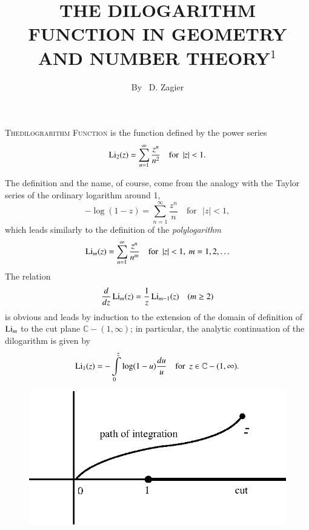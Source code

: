 \title{THE DILOGARITHM FUNCTION IN GEOMETRY AND NUMBER THEORY$^{1}$}


\author{By~ D. Zagier}

\date{}
\maketitle

\setcounter{pageoriginal}{230}
\textsc{The\pageoriginale dilograrithm Function} is the function defined by the power series
$$
\operatorname{Li}_{2}(z)=\sum\limits_{n=1}^{\infty} \frac{z^{n}}{n^{2}}\quad\text{for~ } |z|<1.
$$

The definition and the name, of course, come from the analogy with the Taylor series of the ordinary logarithm around 1,
$$
-\log (1-z)=\sum\limits^{\infty}_{n=1}\frac{z^{n}}{n}\quad\text{for~ } |z|<1,
$$
which leads similarly to the definition of the {\em polylogarithm}
$$
\operatorname{Li}_{m}(z)=\sum\limits^{\infty}_{n=1}\frac{z^{n}}{n^{m}}\quad\text{for~ } |z|<1, \ m=1,2,\ldots
$$
The relation
$$
\frac{d}{dz}\operatorname{Li}_{m}(z)=\frac{1}{z}\operatorname{Li}_{m-1}(z)\quad (m\geq 2)
$$
is obvious and leads by induction to the extension of the domain of definition of $\operatorname{Li}_{m}$ to the cut plane $\mathbb{C}-(1,\infty)$; in particular, the analytic continuation of the dilogarithm is given by
$$
\operatorname{Li}_{1}(z)=-\int\limits^{z}_{0}\log (1-u)\frac{du}{u}\quad\text{for~ } z\in \mathbb{C}-(1,\infty).
$$
\begin{figure}[H]
\centering
\includegraphics[scale=.9]{figures/fig1.eps}
\end{figure}

